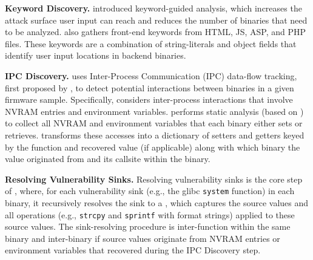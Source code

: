 
\smallskip
\noindent
\textbf{Keyword Discovery.}
\satc introduced keyword-guided analysis, which increases the attack surface user input can reach and reduces the number of binaries that need to be analyzed.
\mango also gathers front-end keywords from HTML, JS, ASP, and PHP files.
These keywords are a combination of string-literals and object fields that identify user input locations in backend binaries.

\smallskip
\noindent
\textbf{IPC Discovery.}
\mango uses Inter-Process Communication (IPC) data-flow tracking, first proposed by \karonte, to detect potential interactions between binaries in a given firmware sample.
Specifically, \mango considers inter-process interactions that involve NVRAM entries and environment variables.
\mango performs static analysis (based on \rda) to collect all NVRAM and environment variables that each binary either sets or retrieves.
\mango transforms these accesses into a dictionary of setters and getters keyed by the function and recovered value (if applicable) along with which binary the value originated from and its callsite within the binary.

\smallskip
\noindent
\textbf{Resolving Vulnerability Sinks.}
Resolving vulnerability sinks is the core step of \mango, where, for each vulnerability sink (e.g., the glibc \texttt{system} function) in each binary, it recursively resolves the sink to a \emph{\richexpr}, which captures the source values and all operations (e.g., \texttt{strcpy} and \texttt{sprintf} with format strings) applied to these source values.
The sink-resolving procedure is inter-function within the same binary and inter-binary if source values originate from NVRAM entries or environment variables that \mango recovered during the IPC Discovery step.

